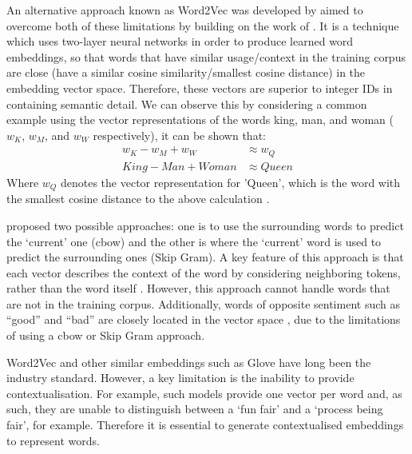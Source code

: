 An alternative approach known as Word2Vec was developed by \citet{mikolov2013efficient} aimed to overcome both of these limitations by building on the work of \citet{bengio2000neural}. It is a technique which uses two-layer neural networks in order to produce learned word embeddings, so that words that have similar usage/context in the training corpus are close (have a similar cosine similarity/smallest cosine distance) in the embedding vector space. Therefore, these vectors are superior to integer IDs in containing semantic detail. We can observe this by considering a common example using the vector representations of the words king, man, and woman ($w_K$, $w_M$, and $w_W$ respectively), it can be shown that:
\begin{equation*}
    \begin{aligned}
        w_K - w_M + w_W &\approx w_Q \\
        King - Man + Woman &\approx Queen
    \end{aligned}
\end{equation*}
Where $w_Q$ denotes the vector representation for 'Queen', which is the word with the smallest cosine distance to the above calculation \citep{allen2019analogies}.

\cite{mikolov2013efficient} proposed two possible approaches: one is to use the surrounding words to predict the `current' one (\acrfull{cbow}) and the other is where the `current' word is used to predict the surrounding ones (Skip Gram). A key feature of this approach is that each vector describes the context of the word by considering neighboring tokens, rather than the word itself \citep{li2018introduction}. However, this approach cannot handle words that are not in the training corpus. Additionally, words of opposite sentiment such as “good” and “bad” are closely located in the vector space \citep{sivakumar2020review}, due to the limitations of using a \acrshort{cbow} or Skip Gram approach.


Word2Vec and other similar embeddings such as Glove \citep{Pennington} have long been the industry standard. However, a key limitation is the inability to provide contextualisation. For example, such models provide one vector per word and, as such, they are unable to distinguish between a `fun fair' and a `process being fair', for example. Therefore it is essential to generate contextualised embeddings to represent words. %


